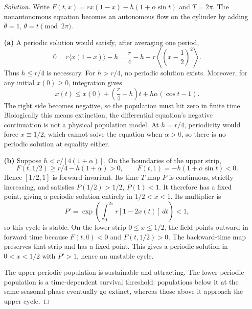 \documentclass[10pt]{amsart}
\newenvironment{solution}
{\begin{proof}[Solution]}
{\end{proof}}
\begin{document}
\begin{onehalfspace}
        \begin{solution}

Write $F(t,x)=rx(1-x)-h(1+\alpha\sin t)$ and $T=2\pi$. The nonautonomous equation becomes an autonomous flow on the cylinder by adding $\dot\theta=1$, $\theta=t\pmod{2\pi}$.

\textbf{(a)} A periodic solution would satisfy, after averaging one period,
\[
 0=r\langle x(1-x)\rangle-h
   =\frac r4-h-r\left\langle\left(x-\frac12\right)^2\right\rangle.
\]
Thus $h\leq r/4$ is necessary. For $h>r/4$, no periodic solution exists. Moreover, for any initial $x(0)\geq0$, integration gives
\[
 x(t)\leq x(0)+\left(\frac r4-h\right)t
              +h\alpha(\cos t-1).
\]
The right side becomes negative, so the population must hit zero in finite time. Biologically this means extinction; the differential equation's negative continuation is not a physical population model. At $h=r/4$, periodicity would force $x\equiv1/2$, which cannot solve the equation when $\alpha>0$, so there is no periodic solution at equality either.

\textbf{(b)} Suppose $h<r/[4(1+\alpha)]$. On the boundaries of the upper strip,
\[
 F(t,1/2)\geq r/4-h(1+\alpha)>0,
 \qquad F(t,1)=-h(1+\alpha\sin t)<0.
\]
Hence $[1/2,1]$ is forward invariant. Its time-$T$ map $P$ is continuous, strictly increasing, and satisfies $P(1/2)>1/2$, $P(1)<1$. It therefore has a fixed point, giving a periodic solution entirely in $1/2<x<1$. Its multiplier is
\[
 P'=\exp\!\left(\int_0^{2\pi}r[1-2x(t)]\,dt\right)<1,
\]
so this cycle is stable. On the lower strip $0\leq x\leq1/2$, the field points outward in forward time because $F(t,0)<0$ and $F(t,1/2)>0$. The backward-time map preserves that strip and has a fixed point. This gives a periodic solution in $0<x<1/2$ with $P'>1$, hence an unstable cycle.

The upper periodic population is sustainable and attracting. The lower periodic population is a time-dependent survival threshold: populations below it at the same seasonal phase eventually go extinct, whereas those above it approach the upper cycle.


\end{solution}
\end{onehalfspace}
\end{document}
